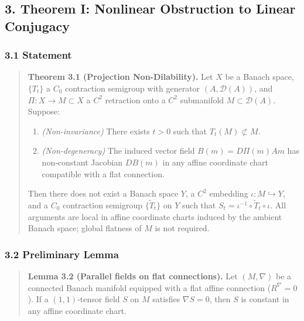 \documentclass[
]{article}
\begin{document}
\subsection{3. Theorem I: Nonlinear Obstruction to Linear
Conjugacy}\label{theorem-i-nonlinear-obstruction-to-linear-conjugacy}

\subsubsection{3.1 Statement}\label{statement}

\begin{quote}
\textbf{Theorem 3.1 (Projection Non-Dilability).} Let \(X\) be a Banach
space, \(\{T_t\}\) a \(C_0\) contraction semigroup with generator
\((A, \mathcal{D}(A))\), and \(\Pi: X \to M \subset X\) a \(C^2\)
retraction onto a \(C^2\) submanifold \(M \subset \mathcal{D}(A)\).
Suppose:

\begin{enumerate}
\def\labelenumi{(\alph{enumi})}
\item
  \emph{(Non-invariance)} There exists \(t > 0\) such that
  \(T_t(M) \not\subset M\).
\item
  \emph{(Non-degeneracy)} The induced vector field \(B(m) = D\Pi(m)Am\)
  has non-constant Jacobian \(DB(m)\) in any affine coordinate chart
  compatible with a flat connection.
\end{enumerate}

Then there does not exist a Banach space \(Y\), a \(C^2\) embedding
\(\iota: M \hookrightarrow Y\), and a \(C_0\) contraction semigroup
\(\{\tilde{T}_t\}\) on \(Y\) such that
\(S_t = \iota^{-1} \circ \tilde{T}_t \circ \iota\). All arguments are
local in affine coordinate charts induced by the ambient Banach space;
global flatness of \(M\) is not required.
\end{quote}

\subsubsection{3.2 Preliminary Lemma}\label{preliminary-lemma}

\begin{quote}
\textbf{Lemma 3.2 (Parallel fields on flat connections).} Let
\((M, \nabla)\) be a connected Banach manifold equipped with a flat
affine connection (\(R^{\nabla} = 0\)). If a \((1,1)\)-tensor field
\(S\) on \(M\) satisfies \(\nabla S = 0\), then \(S\) is constant in any
affine coordinate chart.
\end{quote}
\end{document}
